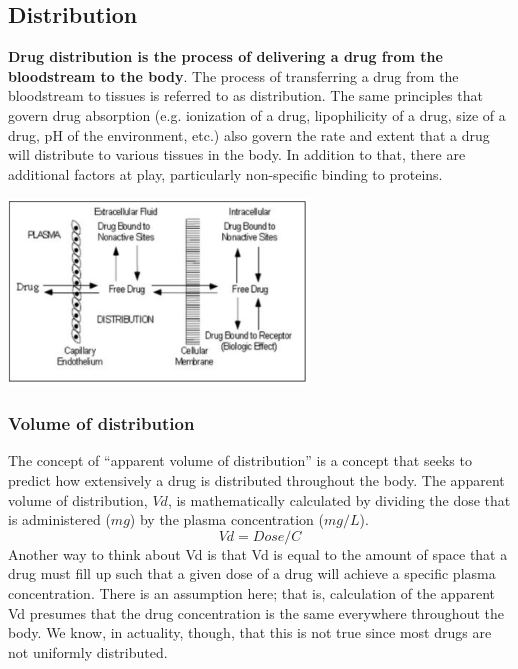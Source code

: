 \documentclass{book}
\begin{document}
\subsection{Distribution}
\textbf{Drug distribution is the process of delivering a drug from the bloodstream to
the body}.
The process of transferring a drug from the bloodstream to tissues is referred to as distribution. 
The same principles that govern drug absorption (e.g. ionization of a drug, lipophilicity of a drug, size of a drug, pH of the environment, etc.) also govern the rate and extent that a drug will distribute to various tissues in the body. 
In addition to that, there are additional factors at play, particularly non-specific binding to proteins.

\includegraphics[width=0.6\textwidth, center]{images/image4.png}

\subsubsection{Volume of distribution}
The concept of “apparent volume of distribution” is a concept that seeks to predict how
extensively a drug is distributed throughout the body. 
The apparent volume of distribution, $Vd$, is mathematically calculated by dividing the dose that is administered ($mg$) by the plasma concentration ($mg/L$).
\begin{equation*}
    Vd = Dose/C
\end{equation*}
Another way to think about Vd is that Vd is equal to the amount of space that a drug
must fill up such that a given dose of a drug will achieve a specific plasma
concentration. There is an assumption here; that is, calculation of the apparent Vd
presumes that the drug concentration is the same everywhere throughout the body.
We know, in actuality, though, that this is not true since most drugs are not uniformly
distributed.
\end{document}
